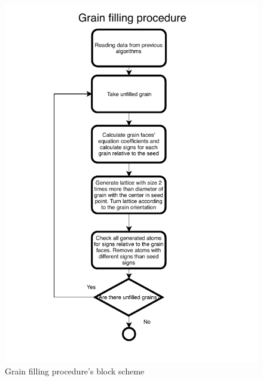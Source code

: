 \documentclass[12pt]{report}
\begin{document}
\begin{figure}
    \centering
    \includegraphics[width=5.0in]{GrainFillingScheme}
    \caption{Grain filling procedure's block scheme}
    \label{grainfillingblock}
\end{figure}
\end{document}
